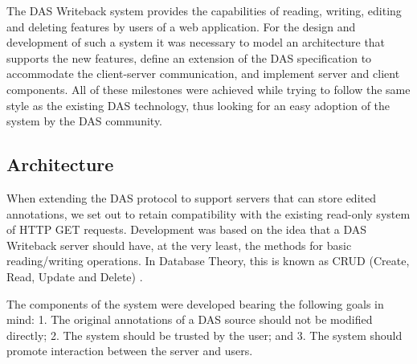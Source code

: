 The DAS Writeback system provides the capabilities of reading, writing, editing and deleting features by users of a web application. For the design and development of such a system it was necessary to model an architecture that supports the new features, define an extension of the DAS specification to accommodate the client-server communication, and implement server and client components. All of these milestones were achieved while trying to follow the same style as the existing DAS technology, thus looking for an easy adoption of the system by the DAS community.

\subsection{Architecture}
When extending the DAS protocol to support servers that can store edited annotations, we set out to retain compatibility with the existing read-only system of HTTP GET requests. Development was based on the idea that a DAS Writeback server should have, at the very least, the methods for basic reading/writing operations. In Database Theory, this is known as CRUD (Create, Read, Update and Delete) \cite{KIL1990}.

The components of the system were developed bearing the following goals in mind: 1. The original annotations of a DAS source should not be modified directly; 2. The system should be trusted by the user; and 3. The system should promote interaction between the server and users.

